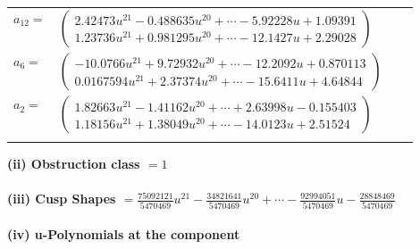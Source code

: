 \documentclass[1p]{elsarticle_modified}
\theoremstyle{definition}
\begin{document}
\begin{tabular}{m{7pt} m{180pt} m{7pt} m{180pt} }
\flushright $a_{12}=$&$\begin{pmatrix}2.42473 u^{21}-0.488635 u^{20}+\cdots-5.92228 u+1.09391\\1.23736 u^{21}+0.981295 u^{20}+\cdots-12.1427 u+2.29028\end{pmatrix}$ \\
\flushright $a_{6}=$&$\begin{pmatrix}-10.0766 u^{21}+9.72932 u^{20}+\cdots-12.2092 u+0.870113\\0.0167594 u^{21}+2.37374 u^{20}+\cdots-15.6411 u+4.64844\end{pmatrix}$ \\
\flushright $a_{2}=$&$\begin{pmatrix}1.82663 u^{21}-1.41162 u^{20}+\cdots+2.63998 u-0.155403\\1.18156 u^{21}+1.38049 u^{20}+\cdots-14.0123 u+2.51524\end{pmatrix}$\\&\end{tabular}
\flushleft \textbf{(ii) Obstruction class $= 1$}\\~\\
\flushleft \textbf{(iii) Cusp Shapes $= \frac{75092121}{5470469} u^{21}-\frac{34821641}{5470469} u^{20}+\cdots-\frac{92994051}{5470469} u-\frac{28848469}{5470469}$}\\~\\
\newpage\renewcommand{\arraystretch}{1}
\flushleft \textbf{(iv) u-Polynomials at the component}\newline \\
\end{document}
